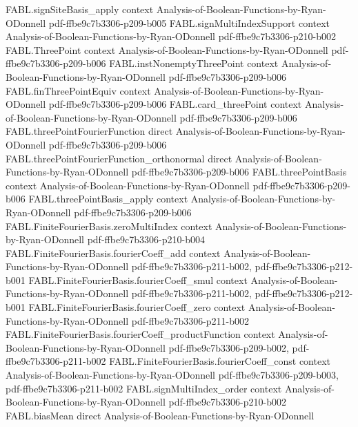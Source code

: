 \begin{theorem}
\proofstep
  {FABL.signSiteBasis_apply}
  {context}
  {Analysis-of-Boolean-Functions-by-Ryan-ODonnell}
  {pdf-ffbe9c7b3306-p209-b005}
\proofstep
  {FABL.signMultiIndexSupport}
  {context}
  {Analysis-of-Boolean-Functions-by-Ryan-ODonnell}
  {pdf-ffbe9c7b3306-p210-b002}
\proofstep
  {FABL.ThreePoint}
  {context}
  {Analysis-of-Boolean-Functions-by-Ryan-ODonnell}
  {pdf-ffbe9c7b3306-p209-b006}
\proofstep
  {FABL.instNonemptyThreePoint}
  {context}
  {Analysis-of-Boolean-Functions-by-Ryan-ODonnell}
  {pdf-ffbe9c7b3306-p209-b006}
\proofstep
  {FABL.finThreePointEquiv}
  {context}
  {Analysis-of-Boolean-Functions-by-Ryan-ODonnell}
  {pdf-ffbe9c7b3306-p209-b006}
\proofstep
  {FABL.card_threePoint}
  {context}
  {Analysis-of-Boolean-Functions-by-Ryan-ODonnell}
  {pdf-ffbe9c7b3306-p209-b006}
\proofstep
  {FABL.threePointFourierFunction}
  {direct}
  {Analysis-of-Boolean-Functions-by-Ryan-ODonnell}
  {pdf-ffbe9c7b3306-p209-b006}
\proofstep
  {FABL.threePointFourierFunction_orthonormal}
  {direct}
  {Analysis-of-Boolean-Functions-by-Ryan-ODonnell}
  {pdf-ffbe9c7b3306-p209-b006}
\proofstep
  {FABL.threePointBasis}
  {context}
  {Analysis-of-Boolean-Functions-by-Ryan-ODonnell}
  {pdf-ffbe9c7b3306-p209-b006}
\proofstep
  {FABL.threePointBasis_apply}
  {context}
  {Analysis-of-Boolean-Functions-by-Ryan-ODonnell}
  {pdf-ffbe9c7b3306-p209-b006}
\proofstep
  {FABL.FiniteFourierBasis.zeroMultiIndex}
  {context}
  {Analysis-of-Boolean-Functions-by-Ryan-ODonnell}
  {pdf-ffbe9c7b3306-p210-b004}
\proofstep
  {FABL.FiniteFourierBasis.fourierCoeff_add}
  {context}
  {Analysis-of-Boolean-Functions-by-Ryan-ODonnell}
  {pdf-ffbe9c7b3306-p211-b002,
    pdf-ffbe9c7b3306-p212-b001}
\proofstep
  {FABL.FiniteFourierBasis.fourierCoeff_smul}
  {context}
  {Analysis-of-Boolean-Functions-by-Ryan-ODonnell}
  {pdf-ffbe9c7b3306-p211-b002,
    pdf-ffbe9c7b3306-p212-b001}
\proofstep
  {FABL.FiniteFourierBasis.fourierCoeff_zero}
  {context}
  {Analysis-of-Boolean-Functions-by-Ryan-ODonnell}
  {pdf-ffbe9c7b3306-p211-b002}
\proofstep
  {FABL.FiniteFourierBasis.fourierCoeff_productFunction}
  {context}
  {Analysis-of-Boolean-Functions-by-Ryan-ODonnell}
  {pdf-ffbe9c7b3306-p209-b002,
    pdf-ffbe9c7b3306-p211-b002}
\proofstep
  {FABL.FiniteFourierBasis.fourierCoeff_const}
  {context}
  {Analysis-of-Boolean-Functions-by-Ryan-ODonnell}
  {pdf-ffbe9c7b3306-p209-b003,
    pdf-ffbe9c7b3306-p211-b002}
\proofstep
  {FABL.signMultiIndex_order}
  {context}
  {Analysis-of-Boolean-Functions-by-Ryan-ODonnell}
  {pdf-ffbe9c7b3306-p210-b002}
\proofstep
  {FABL.biasMean}
  {direct}
  {Analysis-of-Boolean-Functions-by-Ryan-ODonnell}

\end{theorem}

